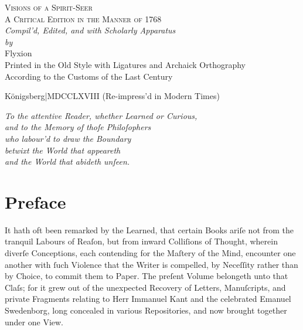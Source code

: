 \documentclass[12pt]{article}
\begin{document}
\begin{titlepage}
\centering

{\Large\scshape Visions of a Spirit-Seer}\\[0.5em]
{\large\scshape A Critical Edition in the Manner of 1768}\\[3em]

{\itshape Compil’d, Edited, and with Scholarly Apparatus}\\
{\itshape by}\\[0.5em]
{\Large Flyxion}\\[6em]

{\small
Printed in the Old Style with Ligatures and Archaick Orthography\\
According to the Customs of the Last Century\\[2em]
}

\vfill

{\small Königsberg\;|\;MDCCLXVIII (Re-impress’d in Modern Times)}
\end{titlepage}

\newpage

\thispagestyle{empty}
\vspace*{5em}


\begin{center}
{\itshape To the attentive Reader, whether Learned or Curious,}\\[0.5em]
{\itshape and to the Memory of thoſe Philoſophers}\\
{\itshape who labour’d to draw the Boundary}\\
{\itshape betwixt the World that appeareth}\\
{\itshape and the World that abideth unſeen.}
\end{center}

\newpage
\section*{Preface}

It hath oft been remarked by the Learned, that certain Books ariſe not from 
the tranquil Labours of Reaſon, but from inward Colliſions of Thought, wherein 
diverſe Conceptions, each contending for the Maſtery of the Mind, encounter one 
another with ſuch Violence that the Writer is compelled, by Neceſſity rather 
than by Choice, to commit them to Paper. The preſent Volume belongeth unto that 
Claſs; for it grew out of the unexpected Recovery of Letters, Manuſcripts, and 
private Fragments relating to Herr Immanuel Kant and the celebrated Emanuel 
Swedenborg, long concealed in various Repositories, and now brought together 
under one View.
\end{document}
